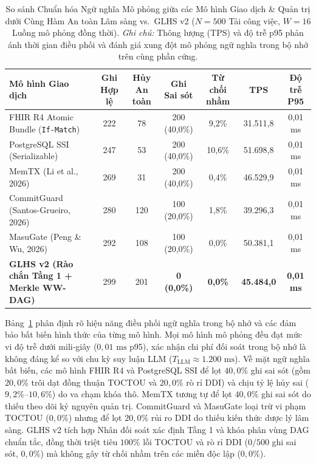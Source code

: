 \documentclass[11pt]{article}
\begin{document}
\begin{table}[t]
\centering
\small
\caption{So sánh Chuẩn hóa Ngữ nghĩa Mô phỏng giữa các Mô hình Giao dịch \& Quản trị dưới Cùng Hàm An toàn Lâm sàng vs.\ GLHS v2 ($N=500$ Tải công việc, $W=16$ Luồng mô phỏng đồng thời). \textit{Ghi chú:} Thông lượng (TPS) và độ trễ p95 phản ánh thời gian điều phối và đánh giá xung đột mô phỏng ngữ nghĩa trong bộ nhớ trên cùng phần cứng.}
\label{tab:baseline_comparison_vi}
\begin{tabularx}{\textwidth}{p{4.4cm} c c c c c c}
\toprule
\textbf{Mô hình Giao dịch} & \textbf{Ghi Hợp lệ} & \textbf{Hủy An toàn} & \textbf{Ghi Sai sót} & \textbf{Từ chối nhầm} & \textbf{TPS} & \textbf{Độ trễ P95} \\
\midrule
FHIR R4 Atomic Bundle (\texttt{If-Match}) & 222 & 78 & 200 (40,0\%) & 9,2\% & 31.511,8 & 0,01 ms \\
PostgreSQL SSI (Serializable) & 247 & 53 & 200 (40,0\%) & 10,6\% & 51.698,8 & 0,01 ms \\
MemTX (Li et al., 2026) & 269 & 31 & 200 (40,0\%) & 0,4\% & 46.529,9 & 0,01 ms \\
CommitGuard (Santos-Grueiro, 2026) & 280 & 120 & 100 (20,0\%) & 1,8\% & 39.296,3 & 0,01 ms \\
MasuGate (Peng \& Wu, 2026) & 292 & 108 & 100 (20,0\%) & 0,0\% & 50.381,1 & 0,01 ms \\
\textbf{GLHS v2 (Rào chắn Tầng 1 + Merkle WW-DAG)} & 299 & 201 & \textbf{0 (0,0\%)} & \textbf{0,0\%} & \textbf{45.484,0} & \textbf{0,01 ms} \\
\bottomrule
\end{tabularx}
\end{table}

Bảng~\ref{tab:baseline_comparison_vi} phân định rõ hiệu năng điều phối ngữ nghĩa trong bộ nhớ và các đảm bảo bất biến hình thức của từng mô hình. Mọi mô hình mô phỏng đều đạt mức vi độ trễ dưới mili-giây ($0{,}01\text{ ms}$ p95), xác nhận chi phí đối soát trong bộ nhớ là không đáng kể so với chu kỳ suy luận LLM ($T_{\text{LLM}} \approx 1.200\text{ ms}$). Về mặt ngữ nghĩa bất biến, các mô hình FHIR R4 và PostgreSQL SSI để lọt $40{,}0\%$ ghi sai sót (gồm $20{,}0\%$ trôi dạt đồng thuận TOCTOU và $20{,}0\%$ rò rỉ DDI) và chịu tỷ lệ hủy sai ($9{,}2\%\text{--}10{,}6\%$) do va chạm khóa thô. MemTX tương tự để lọt $40{,}0\%$ ghi sai sót do thiếu theo dõi kỷ nguyên quản trị. CommitGuard và MasuGate loại trừ vi phạm TOCTOU ($0{,}0\%$) nhưng để lọt $20{,}0\%$ rủi ro DDI do thiếu kiến thức dược lý lâm sàng. GLHS v2 tích hợp Nhân đối soát xác định Tầng 1 và khóa phân vùng DAG chuẩn tắc, đồng thời triệt tiêu $100\%$ lỗi TOCTOU và rò rỉ DDI ($0/500$ ghi sai sót, $0{,}0\%$) mà không gây từ chối nhầm trên các miền độc lập ($0{,}0\%$).
\end{document}
